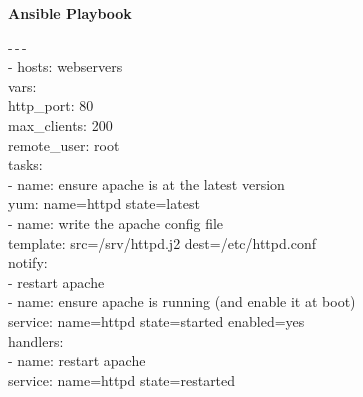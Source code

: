 \begin{algorithm}[H]
	\caption{{\bf Ansible Playbook} \label{ansible_playbook_alg}}
	-\,-\,-\\
	- hosts: webservers\\
	\hspace{0.7em}vars:\\
	\hspace{1.5em}http\_port: 80\\
	\hspace{1.5em}max\_clients: 200\\
	\hspace{0.7em}remote\_user: root\\
	\hspace{0.7em}tasks:\\
	\hspace{0.7em}- name: ensure apache is at the latest version\\
	\hspace{1.4em}yum: name=httpd state=latest\\
	\hspace{0.7em}- name: write the apache config file\\
	\hspace{1.4em}template: src=/srv/httpd.j2 dest=/etc/httpd.conf\\
	\hspace{1.4em}notify:\\
	\hspace{1.4em}- restart apache\\
	\hspace{0.7em}- name: ensure apache is running (and enable it at boot)\\
	\hspace{1.4em}service: name=httpd state=started enabled=yes\\
	\hspace{0.7em}handlers:\\
	\hspace{2em}- name: restart apache\\
	\hspace{2.7em}service: name=httpd state=restarted\\
	
\end{algorithm}

